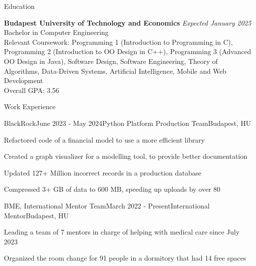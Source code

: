\documentclass[
	a4paper, %
	11pt, %
]{resume} %
\begin{document}

\begin{rSection}{Education}
	
	\textbf{Budapest University of Technology and Economics} \hfill \textit{Expected January 2025} \\ 
	Bachelor in Computer Engineering \\
	Relevant Coursework: Programming 1 (Introduction to Programming in C), Programming 2 (Introduction to OO Design in C++), Programming 3 (Advanced OO Design in Java), Software Design, Software Engineering, Theory of Algorithms, Data-Driven Systems, Artificial Intelligence, Mobile and Web Development \\
	Overall GPA: 3.56
	
\end{rSection}


\begin{rSection}{Work Experience}

	\begin{rSubsection}{BlackRock}{June 2023 - May 2024}{Python Platform Production Team}{Budapest, HU}
		\item Refactored code of a financial model to use a more efficient library
		\item Created a graph visualizer for a modelling tool, to provide better documentation 
		\item Updated 127+ Million incorrect records in a production database
		\item Compressed 3+ GB of data to 600 MB, speeding up uploads by over 80%
	\end{rSubsection}


	\begin{rSubsection}{BME, International Mentor Team}{March 2022 - Present}{International Mentor}{Budapest, HU}
		\item Leading a team of 7 mentors in charge of helping with medical care since July 2023
		\item Organized the room change for 91 people in a dormitory that had 14 free spaces
	\end{rSubsection}

\end{rSection}
\end{document}
